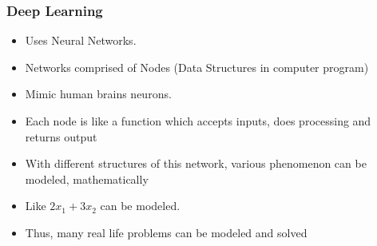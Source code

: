 







\begin{frame}[fragile]\frametitle{Deep Learning}
\begin{itemize}
\item Uses Neural Networks.
\item Networks comprised of Nodes (Data Structures in computer program)
\item Mimic human brains neurons.
\item Each node is like a function which accepts inputs, does processing and returns output
\item With different structures of this network, various phenomenon can be modeled, mathematically
\item Like $2x_1 + 3x_2$ can be modeled.
\item Thus, many real life problems can be modeled and solved
\end{itemize}
\end{frame}

